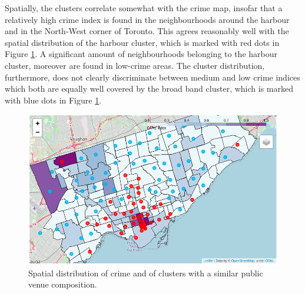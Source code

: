 \documentclass{article}
\begin{document}
Spatially, the clusters correlate somewhat with the crime map, insofar that a relatively high crime index is found in the neighbourhoods around the harbour and in the North-West corner of Toronto. This agrees reasonably well with the spatial distribution of the harbour cluster, which is marked with red dots in Figure \ref{fig:clustercrime}. A significant amount of neighbourhoods belonging to the harbour cluster, moreover are found in low-crime areas. The cluster distribution, furthermore, does not clearly discriminate between medium and low crime indices which both are equally well covered by the broad band cluster, which is marked with blue dots in Figure \ref{fig:clustercrime}.
\begin{figure}[ht]
\centering
 \includegraphics[width=\textwidth]{pics/clustercrime.png}
 \caption{Spatial distribution of crime and of clusters with a similar public venue composition.}\label{fig:clustercrime}
\end{figure}
\end{document}
